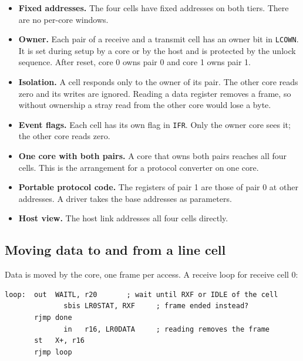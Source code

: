 \documentclass[10pt,a4paper]{article}
\newcommand{\reg}[1]{\texttt{#1}}
\begin{document}
\begin{itemize}
\item \textbf{Fixed addresses.} The four cells have fixed addresses on both tiers. There are no per-core windows.
\item \textbf{Owner.} Each pair of a receive and a transmit cell has an owner bit in \reg{LCOWN}. It is set during
setup by a core or by the host and is protected by the unlock sequence. After reset, core 0 owns pair 0 and
core 1 owns pair 1.
\item \textbf{Isolation.} A cell responds only to the owner of its pair. The other core reads zero and its writes
are ignored. Reading a data register removes a frame, so without ownership a stray read from the other core
would lose a byte.
\item \textbf{Event flags.} Each cell has its own flag in \reg{IFR}. Only the owner core sees it; the other core
reads zero.
\item \textbf{One core with both pairs.} A core that owns both pairs reaches all four cells. This is the
arrangement for a protocol converter on one core.
\item \textbf{Portable protocol code.} The registers of pair 1 are those of pair 0 at other addresses. A driver
takes the base addresses as parameters.
\item \textbf{Host view.} The host link addresses all four cells directly.
\end{itemize}

\subsection{Moving data to and from a line cell}

Data is moved by the core, one frame per access. A receive loop for receive cell 0:

\begin{verbatim}
loop:  out  WAITL, r20       ; wait until RXF or IDLE of the cell
              sbis LR0STAT, RXF     ; frame ended instead?
       rjmp done
              in   r16, LR0DATA     ; reading removes the frame
       st   X+, r16
       rjmp loop
\end{verbatim}
\end{document}
